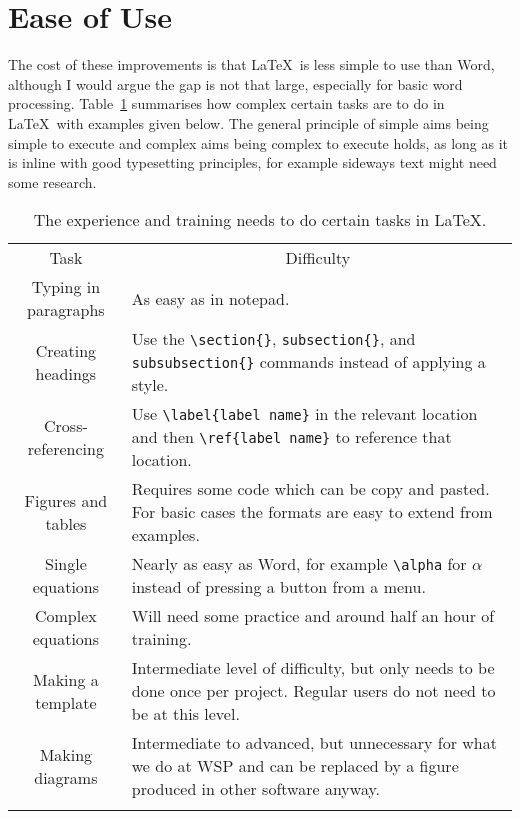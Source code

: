 \section{Ease of Use}
\label{sec:EaseOfUse}

The cost of these improvements is that \LaTeX\ is less simple to use than Word, although I would argue the gap is not that large, especially for basic word processing. Table~\ref{tab:Difficulty} summarises how complex certain tasks are to do in \LaTeX\ with examples given below. The general principle of simple aims being simple to execute and complex aims being complex to execute holds, as long as it is inline with good typesetting principles, for example sideways text might need some research.

\begin{table}[H]
	\caption{The experience and training needs to do certain tasks in \LaTeX.}
	\label{tab:Difficulty}
	\centering
	\begin{tabular}{cp{110 mm}}
		\myhline
		Task & \multicolumn{1}{c}{Difficulty}  \\
		\myhline
		Typing in paragraphs & As easy as in notepad.  \\
		Creating headings & Use the \Verb_\section{}_, \Verb_subsection{}_, and \Verb_subsubsection{}_ commands instead of applying a style.  \\
		Cross-referencing & Use \Verb_\label{label name}_ in the relevant location and then \Verb_\ref{label name}_ to reference that location.  \\
		Figures and tables & Requires some code which can be copy and pasted. For basic cases the formats are easy to extend from examples.  \\
		Single equations & Nearly as easy as Word, for example \Verb_\alpha_ for $\alpha$ instead of pressing a button from a menu.  \\
		Complex equations & Will need some practice and around half an hour of training.  \\
		Making a template & Intermediate level of difficulty, but only needs to be done once per project. Regular users do not need to be at this level.  \\
		Making diagrams & Intermediate to advanced, but unnecessary for what we do at WSP and can be replaced by a figure produced in other software anyway.  \\
		\myhline
	\end{tabular}
\end{table}

